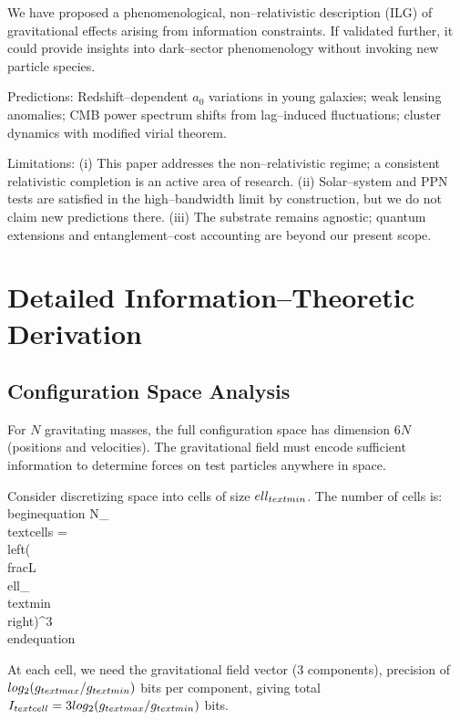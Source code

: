 \documentclass[twocolumn,prd,amsmath,amssymb,aps,superscriptaddress,nofootinbib]{revtex4-2}
\begin{document}
We have proposed a phenomenological, non--relativistic description (ILG) of gravitational effects arising from information constraints. If validated further, it could provide insights into dark--sector phenomenology without invoking new particle species.

Predictions: Redshift--dependent $a_0$ variations in young galaxies; weak lensing anomalies; CMB power spectrum shifts from lag--induced fluctuations; cluster dynamics with modified virial theorem.

Limitations: (i) This paper addresses the non--relativistic regime; a consistent relativistic completion is an active area of research. (ii) Solar--system and PPN tests are satisfied in the high--bandwidth limit by construction, but we do not claim new predictions there. (iii) The substrate remains agnostic; quantum extensions and entanglement--cost accounting are beyond our present scope.

\appendix

\section{Detailed Information--Theoretic Derivation}

\subsection{Configuration Space Analysis}

For $N$ gravitating masses, the full configuration space has dimension $6N$ (positions and velocities). The gravitational field must encode sufficient information to determine forces on test particles anywhere in space.

Consider discretizing space into cells of size $\\ell_{\\text{min}}$. The number of cells is:
\\begin{equation}
N_{\\text{cells}} = \\left(\\frac{L}{\\ell_{\\text{min}}}\\right)^3
\\end{equation}

At each cell, we need the gravitational field vector (3 components), precision of $\\log_2(g_{\\text{max}}/g_{\\text{min}})$ bits per component, giving total $I_{\\text{cell}} = 3 \\log_2(g_{\\text{max}}/g_{\\text{min}})$ bits.
\end{document}
